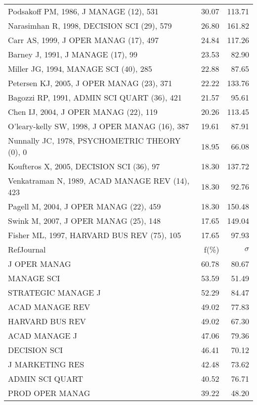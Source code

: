 \documentclass[a4paper,11pt]{report}
\begin{document}
\begin{landscape}
\begin{table}[!ht]
{\begin{tabular}{|l r r|}
Podsakoff PM, 1986, J MANAGE (12), 531 & 30.07 & 113.71\\
Narasimhan R, 1998, DECISION SCI (29), 579 & 26.80 & 161.82\\
Carr AS, 1999, J OPER MANAG (17), 497 & 24.84 & 117.26\\
Barney J, 1991, J MANAGE (17), 99 & 23.53 & 82.90\\
Miller JG, 1994, MANAGE SCI (40), 285 & 22.88 & 87.65\\
Petersen KJ, 2005, J OPER MANAG (23), 371 & 22.22 & 133.76\\
Bagozzi RP, 1991, ADMIN SCI QUART (36), 421 & 21.57 & 95.61\\
Chen IJ, 2004, J OPER MANAG (22), 119 & 20.26 & 113.45\\
O'leary-kelly SW, 1998, J OPER MANAG (16), 387 & 19.61 & 87.91\\
Nunnally JC, 1978, PSYCHOMETRIC THEORY (0), 0 & 18.95 & 66.08\\
Koufteros X, 2005, DECISION SCI (36), 97 & 18.30 & 137.72\\
Venkatraman N, 1989, ACAD MANAGE REV (14), 423 & 18.30 & 92.76\\
Pagell M, 2004, J OPER MANAG (22), 459 & 18.30 & 150.48\\
Swink M, 2007, J OPER MANAG (25), 148 & 17.65 & 149.04\\
Fisher ML, 1997, HARVARD BUS REV (75), 105 & 17.65 & 97.93\\
\hline
\hline
RefJournal & f(\%) & $\sigma$\\
\hline
J OPER MANAG & 60.78 & 80.67\\
MANAGE SCI & 53.59 & 51.49\\
STRATEGIC MANAGE J & 52.29 & 84.47\\
ACAD MANAGE REV & 49.02 & 77.83\\
HARVARD BUS REV & 49.02 & 67.30\\
ACAD MANAGE J & 47.06 & 79.36\\
DECISION SCI & 46.41 & 70.12\\
J MARKETING RES & 42.48 & 73.62\\
ADMIN SCI QUART & 40.52 & 76.71\\
PROD OPER MANAG & 39.22 & 48.20\\
\hline
\end{tabular}
}
\end{table}

\clearpage


\end{landscape}
\end{document}
